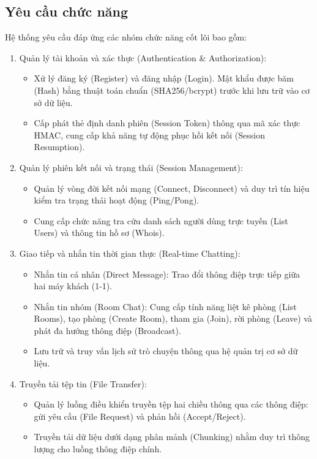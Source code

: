 \subsection{Yêu cầu chức năng}

Hệ thống yêu cầu đáp ứng các nhóm chức năng cốt lõi bao gồm:

\begin{enumerate}
    \item Quản lý tài khoản và xác thực (Authentication \& Authorization): 
    \begin{itemize}[label={-}]
        \item Xử lý đăng ký (Register) và đăng nhập (Login). Mật khẩu được băm (Hash) bằng thuật toán chuẩn (SHA256/bcrypt) trước khi lưu trữ vào cơ sở dữ liệu.
        \item Cấp phát thẻ định danh phiên (Session Token) thông qua mã xác thực HMAC, cung cấp khả năng tự động phục hồi kết nối (Session Resumption).
    \end{itemize}

    \item Quản lý phiên kết nối và trạng thái (Session Management):
    \begin{itemize}[label={-}]
        \item Quản lý vòng đời kết nối mạng (Connect, Disconnect) và duy trì tín hiệu kiểm tra trạng thái hoạt động (Ping/Pong).
        \item Cung cấp chức năng tra cứu danh sách người dùng trực tuyến (List Users) và thông tin hồ sơ (Whois).
    \end{itemize}

    \item Giao tiếp và nhắn tin thời gian thực (Real-time Chatting):
    \begin{itemize}[label={-}]
        \item Nhắn tin cá nhân (Direct Message): Trao đổi thông điệp trực tiếp giữa hai máy khách (1-1).
        \item Nhắn tin nhóm (Room Chat): Cung cấp tính năng liệt kê phòng (List Rooms), tạo phòng (Create Room), tham gia (Join), rời phòng (Leave) và phát đa hướng thông điệp (Broadcast).
        \item Lưu trữ và truy vấn lịch sử trò chuyện thông qua hệ quản trị cơ sở dữ liệu.
    \end{itemize}

    \item Truyền tải tệp tin (File Transfer):
    \begin{itemize}[label={-}]
        \item Quản lý luồng điều khiển truyền tệp hai chiều thông qua các thông điệp: gửi yêu cầu (File Request) và phản hồi (Accept/Reject).
        \item Truyền tải dữ liệu dưới dạng phân mảnh (Chunking) nhằm duy trì thông lượng cho luồng thông điệp chính.
    \end{itemize}


\end{enumerate}
